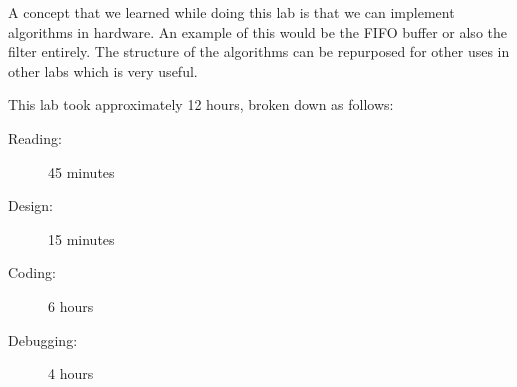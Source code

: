 \documentclass[11pt, titlepage]{article}
\begin{document}
        A concept that we learned while doing this lab is that we can implement algorithms in hardware. An example of this would be the FIFO buffer or also the filter entirely. The structure of the algorithms can be repurposed for other uses in other labs which is very useful.
    

        This lab took approximately 12 hours, broken down as follows:
        \begin{description}
            \item[Reading:] 45 minutes
            \item[Design:] 15 minutes
            \item[Coding:] 6 hours
            \item[Debugging:] 4 hours
        \end{description}   
        
\end{document}
